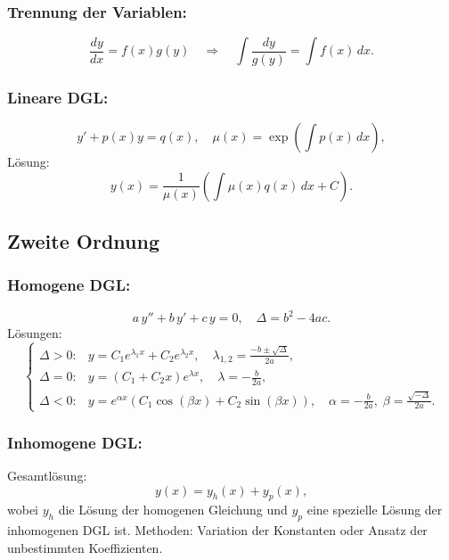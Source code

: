 \documentclass[12pt]{article}
\begin{document}
\subsubsection*{Trennung der Variablen:}
\[
\frac{dy}{dx} = f(x)g(y) \quad \Rightarrow \quad \int \frac{dy}{g(y)} = \int f(x)\,dx.
\]
\subsubsection*{Lineare DGL:}
\[
y' + p(x)y = q(x), \quad \mu(x)=\exp\left(\int p(x)\,dx\right),
\]
Lösung:
\[
y(x)=\frac{1}{\mu(x)}\left( \int \mu(x)q(x)\,dx + C \right).
\]

\subsection*{Zweite Ordnung}
\subsubsection*{Homogene DGL:}
\[
a\, y'' + b\, y' + c\, y = 0, \quad \Delta = b^2 - 4ac.
\]
Lösungen:
\[
\begin{cases}
\Delta > 0: & y = C_1 e^{\lambda_1 x} + C_2 e^{\lambda_2 x}, \quad \lambda_{1,2}=\frac{-b\pm\sqrt{\Delta}}{2a},\\[1ex]
\Delta = 0: & y = (C_1 + C_2 x)e^{\lambda x}, \quad \lambda=-\frac{b}{2a},\\[1ex]
\Delta < 0: & y = e^{\alpha x}\left(C_1 \cos(\beta x) + C_2 \sin(\beta x)\right), \quad \alpha=-\frac{b}{2a},\; \beta=\frac{\sqrt{-\Delta}}{2a}.
\end{cases}
\]
\subsubsection*{Inhomogene DGL:}
Gesamtlösung:
\[
y(x)= y_h(x) + y_p(x),
\]
wobei \(y_h\) die Lösung der homogenen Gleichung und \(y_p\) eine spezielle Lösung der inhomogenen DGL ist.  
Methoden: Variation der Konstanten oder Ansatz der unbestimmten Koeffizienten.
\end{document}
